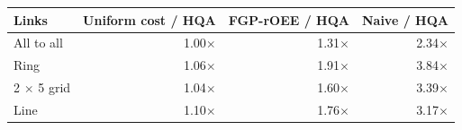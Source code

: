 \begin{tabular}{lrrr}
\toprule
Links & Uniform cost / HQA & FGP-rOEE / HQA & Naive / HQA \\
\midrule
All to all & 1.00$\times$ & 1.31$\times$ & 2.34$\times$ \\
Ring & 1.06$\times$ & 1.91$\times$ & 3.84$\times$ \\
2 $\times$ 5 grid & 1.04$\times$ & 1.60$\times$ & 3.39$\times$ \\
Line & 1.10$\times$ & 1.76$\times$ & 3.17$\times$ \\
\bottomrule
\end{tabular}
